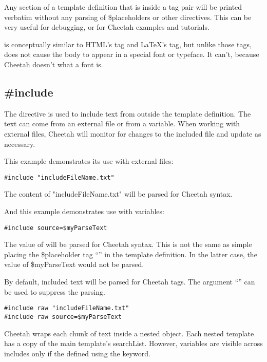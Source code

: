 Any section of a template definition that is inside a  tag pair will be printed verbatim without any parsing of
\$placeholders or other directives. This can be very useful for debugging, or
for Cheetah examples and tutorials.

 is conceptually similar to HTML's  tag and LaTeX's
\code{\\verbatim\{\}} tag, but unlike those tags,  does not cause
the body to appear in a special font or typeface.  It can't, because Cheetah
doesn't what a font is.  


\subsection{\#include}
\label{output.include}

The  directive is  used to include text from outside the
template definition.  The text can come from an external file or from a
 variable.  When working with external files, Cheetah will
monitor for changes to the included file and update as necessary.  

This example demonstrates its use with external files:
\begin{verbatim}
#include "includeFileName.txt"
\end{verbatim}
The content of "includeFileName.txt" will be parsed for Cheetah syntax.

And this example demonstrates use with  variables:
\begin{verbatim}
#include source=$myParseText
\end{verbatim}
The value of  will be parsed for Cheetah syntax. This is not
the same as simple placing the \$placeholder tag ``'' in
the template definition.  In the latter case, the value of \$myParseText would
not be parsed.

By default, included text will be parsed for Cheetah tags.  The argument
``'' can be used to suppress the parsing.

\begin{verbatim}
#include raw "includeFileName.txt"
#include raw source=$myParseText
\end{verbatim}

Cheetah wraps each chunk of  text inside a nested
 object.  Each nested template has a copy of the main
template's searchList.  However,  variables are visible
across includes only if the defined using the  keyword.

